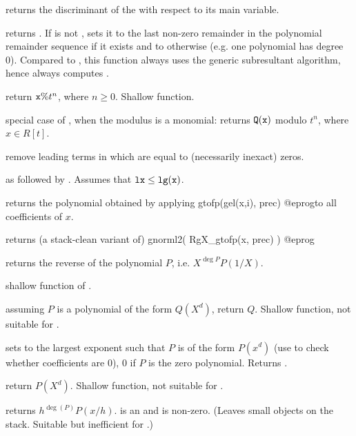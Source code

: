  returns the discriminant of the  
with respect to its main variable.

 returns
. If  is not , sets it to the last
non-zero remainder in the polynomial remainder sequence if it exists and to
 otherwise (e.g. one polynomial has degree 0). Compared to
, this function always uses the generic subresultant
algorithm, hence always computes .

 return ${\tt x \% } t^n$,
where $n\geq 0$. Shallow function.

 special case of
, when the modulus is a monomial:
returns ${\tt Q}({\tt x})$ modulo $t^n$, where $x \in R[t]$.

 remove leading terms in  which are
equal to (necessarily inexact) zeros.

 as 
followed by . Assumes that ${\tt lx} \leq
{\tt lg(x)}$.

 returns the polynomial obtained by
applying
\bprog
  gtofp(gel(x,i), prec)
@eprog\noindent to all coefficients of $x$.

 returns (a stack-clean variant of)
\bprog
  gnorml2( RgX_gtofp(x, prec) )
@eprog

 returns the reverse of the polynomial
$P$, i.e. $X^{\deg P} P(1/X)$.

 shallow function of .

 assuming $P$ is a polynomial of the
form $Q(X^d)$, return $Q$. Shallow function, not suitable for
.

 sets  to the largest exponent
such that $P$ is of the form $P(x^d)$ (use  to check
whether coefficients are 0), $0$ if $P$ is the zero polynomial. Returns
.

 return $P(X^d)$. Shallow function, not
suitable for .

 returns $h^{\deg(P)} P(x/h)$.
 is an  and  is non-zero. (Leaves small objects on the
stack. Suitable but inefficient for .)

